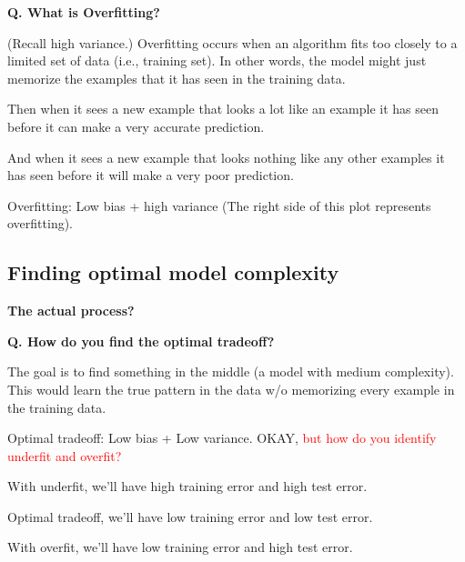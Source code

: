\begin{frame}[fragile]{\textbf{Q. What is Overfitting?}}
  \begin{wideitemize}
    \item (Recall high variance.) Overfitting occurs when an algorithm
    fits too closely to a limited set of data (i.e., training set). In other
    words, the model might just memorize the examples that it has seen in
    the training data.
    \begin{wideitemize}
      \item Then when it sees a new example that looks a lot like an
      example it has seen before it can make a very accurate prediction.
      \item And when it sees a new example that looks nothing like any
      other examples it has seen before it will make a very poor prediction.
    \end{wideitemize}
    \item Overfitting: Low bias + high variance (The right side of this plot represents overfitting).
  \end{wideitemize}
\end{frame}

\subsection{Finding optimal model complexity}
\begin{transitionsubframe}
  \begin{center}
    \Huge \textbf{The actual process?}
  \end{center}
\end{transitionsubframe}

\begin{frame}[fragile]{\textbf{Q. How do you find the optimal tradeoff?}}
  \begin{wideitemize}
    \item The goal is to find something in the middle (a model with medium
    complexity). This would learn the true pattern in the data w/o memorizing
    every example in the training data.
    \item Optimal tradeoff: Low bias + Low variance. OKAY, \textcolor{red}{but
    how do you identify underfit and overfit?}
    \begin{wideitemize}
      \item With underfit, we'll have high training error and high test error.
      \item Optimal tradeoff, we'll have low training error and low test error.
      \item With overfit, we'll have low training error and high test error.
    \end{wideitemize}
  \end{wideitemize}
\end{frame}

